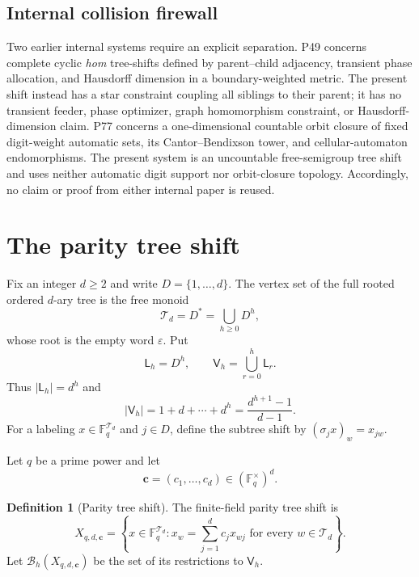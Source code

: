 \documentclass[11pt,a4paper]{amsart}
\theoremstyle{definition}
\newtheorem{definition}[theorem]{Definition}
\theoremstyle{remark}
\newcommand{\F}{\mathbb F}
\newcommand{\cB}{\mathcal B}
\newcommand{\cT}{\mathcal T}
\newcommand{\eps}{\varepsilon}
\newcommand{\Lev}{\mathsf L}
\newcommand{\Vol}{\mathsf V}
\begin{document}
\subsection*{Internal collision firewall}

Two earlier internal systems require an explicit separation.  P49 concerns
complete cyclic \emph{hom} tree-shifts defined by parent--child adjacency,
transient phase allocation, and Hausdorff dimension in a boundary-weighted
metric.  The present shift instead has a star constraint coupling all
siblings to their parent; it has no transient feeder, phase optimizer, graph
homomorphism constraint, or Hausdorff-dimension claim.  P77 concerns a
one-dimensional countable orbit closure of fixed digit-weight automatic
sets, its Cantor--Bendixson tower, and cellular-automaton endomorphisms.  The
present system is an uncountable free-semigroup tree shift and uses neither
automatic digit support nor orbit-closure topology.  Accordingly, no claim
or proof from either internal paper is reused.

\section{The parity tree shift}
\label{sec:setup}

Fix an integer $d\geq2$ and write $D=\{1,\ldots,d\}$.  The vertex set of
the full rooted ordered $d$-ary tree is the free monoid
\[
 \cT_d=D^*=\bigcup_{h\geq0}D^h,
\]
whose root is the empty word $\eps$.  Put
\[
 \Lev_h=D^h,
 \qquad
 \Vol_h=\bigcup_{r=0}^h\Lev_r.
\]
Thus $|\Lev_h|=d^h$ and
\begin{equation}\label{eq:volume-size}
 |\Vol_h|=1+d+\cdots+d^h=\frac{d^{h+1}-1}{d-1}.
\end{equation}
For a labeling $x\in\F_q^{\cT_d}$ and $j\in D$, define the subtree shift by
$(\sigma_jx)_w=x_{jw}$.

Let $q$ be a prime power and let
\begin{equation}\label{eq:nonzero-coefficients}
 \boldsymbol c=(c_1,\ldots,c_d)\in(\F_q^\times)^d.
\end{equation}

\begin{definition}[Parity tree shift]\label{def:shift}
The finite-field parity tree shift is
\begin{equation}\label{eq:shift}
 X_{q,d,\boldsymbol c}
 =\left\{x\in\F_q^{\cT_d}:
 x_w=\sum_{j=1}^dc_jx_{wj}\text{ for every }w\in\cT_d\right\}.
\end{equation}
Let $\cB_h(X_{q,d,\boldsymbol c})$ be the set of its restrictions to
$\Vol_h$.
\end{definition}
\end{document}
